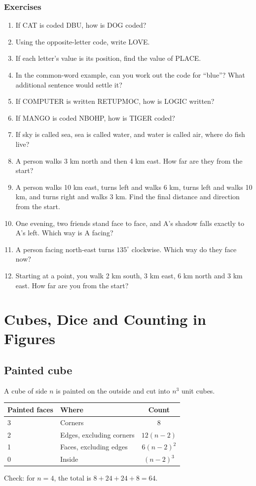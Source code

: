 \documentclass[11pt,a4paper,openany]{report}
\newenvironment{exercises}{\subsection*{Exercises \thechapter}\begin{enumerate}[label=\textbf{\thechapter.\arabic*},leftmargin=3.2em]}{\end{enumerate}}
\begin{document}
\begin{exercises}
\item If CAT is coded DBU, how is DOG coded?
\item Using the opposite-letter code, write LOVE.
\item If each letter's value is its position, find the value of PLACE.
\item In the common-word example, can you work out the code for ``blue''? What additional sentence would settle it?
\item If COMPUTER is written RETUPMOC, how is LOGIC written?
\item If MANGO is coded NBOHP, how is TIGER coded?
\item If sky is called sea, sea is called water, and water is called air, where do fish live?
\item A person walks 3 km north and then 4 km east. How far are they from the start?
\item A person walks 10 km east, turns left and walks 6 km, turns left and walks 10 km, and turns right and walks 3 km. Find the final distance and direction from the start.
\item One evening, two friends stand face to face, and A's shadow falls exactly to A's left. Which way is A facing?
\item A person facing north-east turns $135^\circ$ clockwise. Which way do they face now?
\item Starting at a point, you walk 2 km south, 3 km east, 6 km north and 3 km east. How far are you from the start?
\end{exercises}

\chapter{Cubes, Dice and Counting in Figures}\label{ch:cube}

\section{Painted cube}
A cube of side $n$ is painted on the outside and cut into $n^3$ unit cubes.
\begin{center}
\begin{tabular}{llc}
\toprule
Painted faces & Where & Count\\\midrule
3 & Corners & 8\\
2 & Edges, excluding corners & $12(n-2)$\\
1 & Faces, excluding edges & $6(n-2)^2$\\
0 & Inside & $(n-2)^3$\\
\bottomrule
\end{tabular}
\end{center}
Check: for $n=4$, the total is $8+24+24+8=64$. \checkmark
\end{document}
